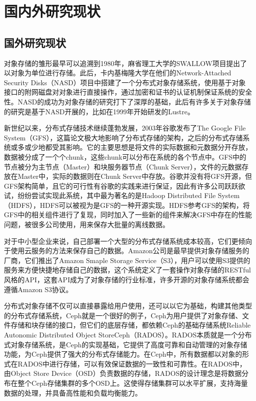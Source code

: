 \section{国内外研究现状}%
\subsection{国外研究现状}%
对象存储的雏形最早可以追溯到1980年，麻省理工大学的SWALLOW项目提出了以对象为单位进行存储\cite{10}。此后，卡内基梅隆大学在他们的Network-Attached Security Disks\cite{11}（NASD）项目中搭建了一个分布式对象存储系统，使用基于对象接口的附网磁盘对对象进行直接操作，通过加密和证书的认证机制保证系统的安全性。NASD的成功为对象存储的研究打下了深厚的基础，此后有许多关于对象存储的研究是基于NASD开展的，比如在1999年开始研发的Lustre\cite{12}。

新世纪以来，分布式存储技术继续蓬勃发展，2003年谷歌发布了The Google File System\cite{13}（GFS），这篇论文极大地影响了分布式存储的架构，之后的分布式存储系统或多或少地都受其影响。它的主要思想是将文件的实际数据和元数据分开存放，数据被分成了一个个chunk，这些chunk可以分布在系统的各个节点中。GFS中的节点被分为主节点（Master）和块服务器节点（Chunk Server），文件的元数据存放在Master中，实际的数据则在Chunk Server中存放。谷歌并没有将GFS开源，但GFS架构简单，且它的可行性有谷歌的实践来进行保证，因此有许多公司跃跃欲试，纷纷尝试实现此系统，其中最为著名的是Hadoop Distributed File System\cite{14}（HDFS），HDFS可以被视为是GFS的一种开源实现。HDFS参考GFS的架构，将GFS中的相关组件进行了复现，同时加入了一些新的组件来解决GFS中存在的性能问题，被很多公司使用，用来保存大批量的离线数据。

对于中小型企业来说，自己部署一个大型的分布式存储系统成本较高，它们更倾向于使用云服务的方法来保存自己的数据。Amazon公司是最早提供对象存储服务的厂商，它们推出了Amazon Smaple Storage Service\cite{15}（S3），用户可以使用S3提供的服务来方便快捷地存储自己的数据，这个系统定义了一套操作对象存储的RESTful风格的API\cite{16}，这套API成为了对象存储的行业标准，许多开源的对象存储系统都会遵循Amazon S3协议。

分布式对象存储不仅可以直接暴露给用户使用，还可以以它为基础，构建其他类型的分布式存储系统，Ceph\cite{17,18}就是一个很好的例子，Ceph为用户提供了对象存储、文件存储和块存储的接口，但它们的底层存储，都依赖Ceph的基础存储系统Reliable Autonomic Distributed Object StoreCeph\cite{19,20}（RADOS）。RADOS本质就是一个分布式对象存储系统，是Ceph的实现基础，它提供了高度可靠和自动管理的对象存储功能，为Ceph提供了强大的分布式存储能力。在Ceph中，所有数据都以对象的形式在RADOS中进行存储，可以有效保证数据的一致性和可靠性。在RADOS中，由Object Store Device（OSD）负责数据的存储，RADOS的设计理念是将数据分布在整个Ceph存储集群的多个OSD上。这使得存储集群可以水平扩展，支持海量数据的处理，并具备高性能和负载均衡能力。

